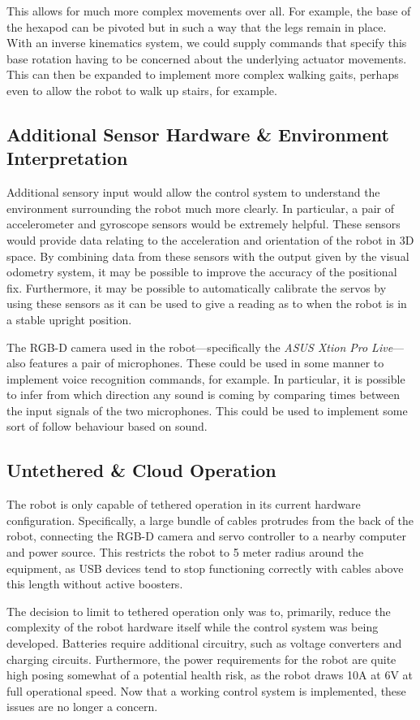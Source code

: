 This allows for much more complex movements over all. For example, the base of the hexapod can be pivoted but in such a way that the legs remain in place. With an inverse kinematics system, we could supply commands that specify this base rotation having to be concerned about the underlying actuator movements. This can then be expanded to implement more complex walking gaits, perhaps even to allow the robot to walk up stairs, for example.

\subsection{Additional Sensor Hardware \& Environment Interpretation}
Additional sensory input would allow the control system to understand the environment surrounding the robot much more clearly. In particular, a pair of accelerometer and gyroscope sensors would be extremely helpful. These sensors would provide data relating to the acceleration and orientation of the robot in 3D space. By combining data from these sensors with the output given by the visual odometry system, it may be possible to improve the accuracy of the positional fix. Furthermore, it may be possible to automatically calibrate the servos by using these sensors as it can be used to give a reading as to when the robot is in a stable upright position.

The RGB-D camera used in the robot---specifically the \emph{ASUS Xtion Pro Live}---also features a pair of microphones. These could be used in some manner to implement voice recognition commands, for example. In particular, it is possible to infer from which direction any sound is coming by comparing times between the input signals of the two microphones. This could be used to implement some sort of follow behaviour based on sound.

\subsection{Untethered \& Cloud Operation}
The robot is only capable of tethered operation in its current hardware configuration. Specifically, a large bundle of cables protrudes from the back of the robot, connecting the RGB-D camera and servo controller to a nearby computer and power source. This restricts the robot to 5 meter radius around the equipment, as USB devices tend to stop functioning correctly with cables above this length without active boosters. 

The decision to limit to tethered operation only was to, primarily, reduce the complexity of the robot hardware itself while the control system was being developed. Batteries require additional circuitry, such as voltage converters and charging circuits. Furthermore, the power requirements for the robot are quite high posing somewhat of a potential health risk, as the robot draws 10A at 6V at full operational speed. Now that a working control system is implemented, these issues are no longer a concern.

